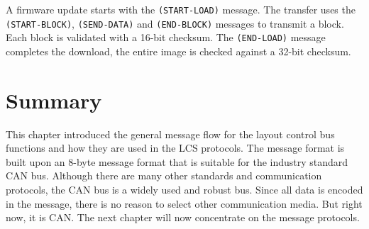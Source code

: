 \begin{table}[ht!]
    \centering 
    \caption{Firmware Update Messages}
\end{table}

A firmware update starts with the \texttt{(START-LOAD)} message. The transfer uses the \texttt{(START-BLOCK)}, \texttt{(SEND-DATA)} and \texttt{(END-BLOCK)} messages to transmit a block. Each block is validated with a 16-bit checksum. The \texttt{(END-LOAD)} message completes the download, the entire image is checked against a 32-bit checksum.


\section{Summary}

This chapter introduced the general message flow for the layout control bus functions and how they are used in the LCS protocols. The message format is built upon an 8-byte message format that is suitable for the industry standard CAN bus. Although there are many other standards and communication protocols, the CAN bus is a widely used and robust bus. Since all data is encoded in the message, there is no reason to select other communication media. But right now, it is CAN. The next chapter will now concentrate on the message protocols.
